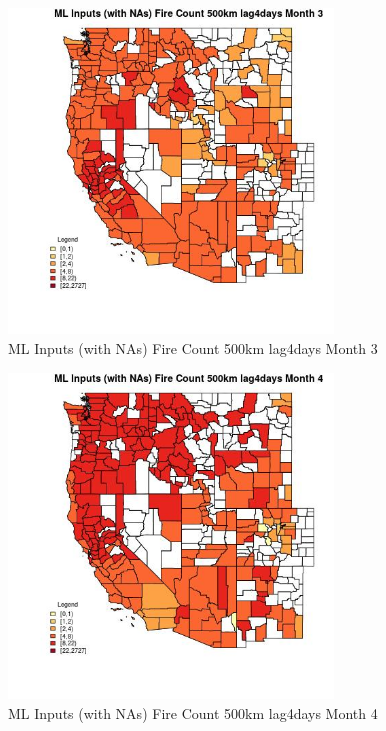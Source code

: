 \clearpage 

\begin{figure} 
\centering  
\includegraphics[width=0.77\textwidth]{Code_Outputs/Report_ML_input_PM25_Step4_part_f_de_duplicated_aveswNAs_CountyFire_Count_500km_lag4daysmedianMonth3.jpg} 
\caption{\label{fig:Report_ML_input_PM25_Step4_part_f_de_duplicated_aveswNAsCountyFire_Count_500km_lag4daysmedianMonth3}ML Inputs (with NAs) Fire Count 500km lag4days Month 3} 
\end{figure} 
 

\begin{figure} 
\centering  
\includegraphics[width=0.77\textwidth]{Code_Outputs/Report_ML_input_PM25_Step4_part_f_de_duplicated_aveswNAs_CountyFire_Count_500km_lag4daysmedianMonth4.jpg} 
\caption{\label{fig:Report_ML_input_PM25_Step4_part_f_de_duplicated_aveswNAsCountyFire_Count_500km_lag4daysmedianMonth4}ML Inputs (with NAs) Fire Count 500km lag4days Month 4} 
\end{figure} 
 

